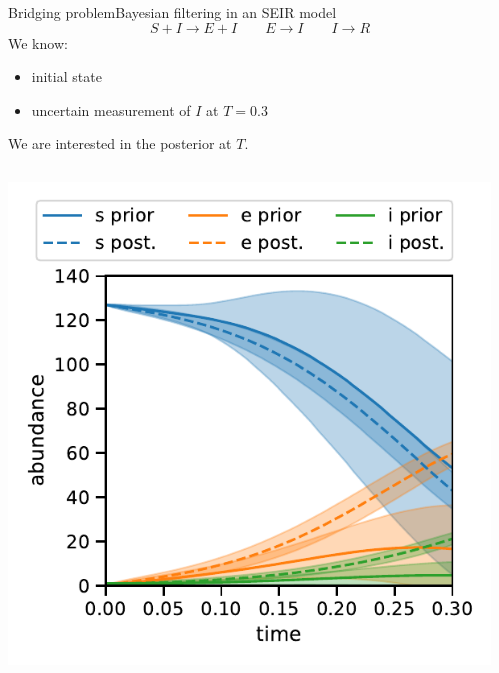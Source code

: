 \documentclass[9pt]{beamer}
\begin{document}
\begin{frame}{Bridging problem}{Bayesian filtering in an SEIR model}
    \[ S+I \rightarrow E+I \qquad E\rightarrow I \qquad I\rightarrow R \]
    We know:
    \begin{itemize}
        \item initial state
        \item uncertain measurement of $I$ at $T=0.3$
    \end{itemize}
    We are interested in the posterior at $T$.
    \begin{columns}
        \begin{column}{.35\paperwidth}
            \includegraphics[width=\textwidth]{../gfx/seir_prior_posterior.pdf}
        \end{column}
        \begin{column}{.35\paperwidth}

\end{column}
\end{columns}
\end{frame}
\end{document}
